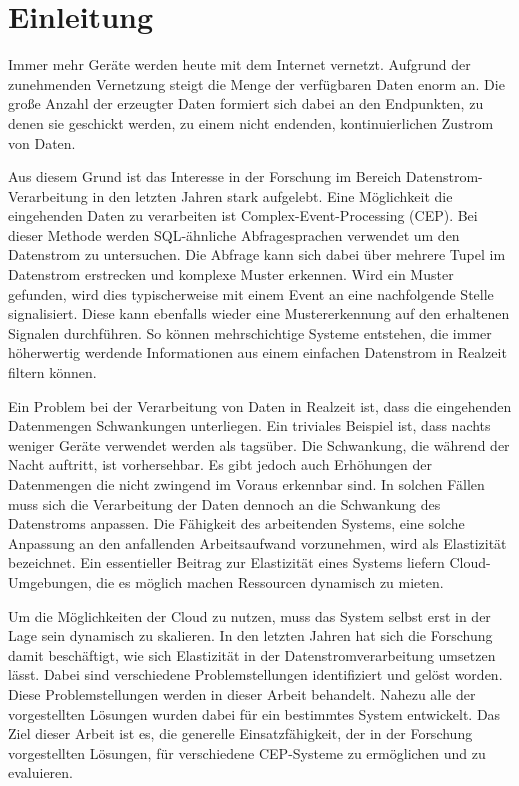 
\chapter{Einleitung}

Immer mehr Geräte werden heute mit dem Internet vernetzt.
Aufgrund der zunehmenden Vernetzung steigt die Menge der verfügbaren Daten enorm an.
Die große Anzahl der erzeugter Daten formiert sich dabei an den Endpunkten, zu denen sie geschickt werden, zu einem nicht endenden, kontinuierlichen Zustrom von Daten.

Aus diesem Grund ist das Interesse in der Forschung im Bereich Datenstrom-Verarbeitung in den letzten Jahren stark aufgelebt.
Eine Möglichkeit die eingehenden Daten zu verarbeiten ist Complex-Event-Processing (CEP).
Bei dieser Methode werden SQL-ähnliche Abfragesprachen verwendet um den Datenstrom zu untersuchen.
Die Abfrage kann sich dabei über mehrere Tupel im Datenstrom erstrecken und komplexe Muster erkennen.
Wird ein Muster gefunden, wird dies typischerweise mit einem Event an eine nachfolgende Stelle signalisiert.
Diese kann ebenfalls wieder eine Mustererkennung auf den erhaltenen Signalen durchführen.
So können mehrschichtige Systeme entstehen, die immer höherwertig werdende Informationen aus einem einfachen Datenstrom in Realzeit filtern können.

Ein Problem bei der Verarbeitung von Daten in Realzeit ist, dass die eingehenden Datenmengen Schwankungen unterliegen.
Ein triviales Beispiel ist, dass nachts weniger Geräte verwendet werden als tagsüber.
Die Schwankung, die während der Nacht auftritt, ist vorhersehbar.
Es gibt jedoch auch Erhöhungen der Datenmengen die nicht zwingend im Voraus erkennbar sind.
In solchen Fällen muss sich die Verarbeitung der Daten dennoch an die Schwankung des Datenstroms anpassen.
Die Fähigkeit des arbeitenden Systems, eine solche Anpassung an den anfallenden Arbeitsaufwand vorzunehmen, wird als Elastizität bezeichnet.
Ein essentieller Beitrag zur Elastizität eines Systems liefern Cloud-Umgebungen, die es möglich machen Ressourcen dynamisch zu mieten.

Um die Möglichkeiten der Cloud zu nutzen, muss das System selbst erst in der Lage sein dynamisch zu skalieren.
In den letzten Jahren hat sich die Forschung damit beschäftigt, wie sich Elastizität in der Datenstromverarbeitung umsetzen lässt.
Dabei sind verschiedene Problemstellungen identifiziert und gelöst worden.
Diese Problemstellungen werden in dieser Arbeit behandelt.
Nahezu alle der vorgestellten Lösungen wurden dabei für ein bestimmtes System entwickelt.
Das Ziel dieser Arbeit ist es, die generelle Einsatzfähigkeit, der in der Forschung vorgestellten Lösungen, für verschiedene CEP-Systeme zu ermöglichen und zu evaluieren.

